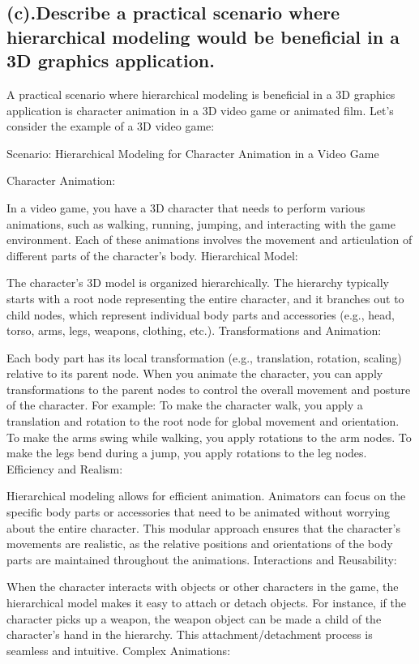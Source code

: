 \documentclass{article}
\begin{document}
\begin{itemize}
\subsection{(c).Describe a practical scenario where hierarchical modeling would be beneficial in a 3D graphics application.}
A practical scenario where hierarchical modeling is beneficial in a 3D graphics application is character animation in a 3D video game or animated film. Let's consider the example of a 3D video game:

Scenario: Hierarchical Modeling for Character Animation in a Video Game

Character Animation:

In a video game, you have a 3D character that needs to perform various animations, such as walking, running, jumping, and interacting with the game environment. Each of these animations involves the movement and articulation of different parts of the character's body.
Hierarchical Model:

The character's 3D model is organized hierarchically. The hierarchy typically starts with a root node representing the entire character, and it branches out to child nodes, which represent individual body parts and accessories (e.g., head, torso, arms, legs, weapons, clothing, etc.).
Transformations and Animation:

Each body part has its local transformation (e.g., translation, rotation, scaling) relative to its parent node. When you animate the character, you can apply transformations to the parent nodes to control the overall movement and posture of the character. For example:
To make the character walk, you apply a translation and rotation to the root node for global movement and orientation.
To make the arms swing while walking, you apply rotations to the arm nodes.
To make the legs bend during a jump, you apply rotations to the leg nodes.
Efficiency and Realism:

Hierarchical modeling allows for efficient animation. Animators can focus on the specific body parts or accessories that need to be animated without worrying about the entire character. This modular approach ensures that the character's movements are realistic, as the relative positions and orientations of the body parts are maintained throughout the animations.
Interactions and Reusability:

When the character interacts with objects or other characters in the game, the hierarchical model makes it easy to attach or detach objects. For instance, if the character picks up a weapon, the weapon object can be made a child of the character's hand in the hierarchy. This attachment/detachment process is seamless and intuitive.
Complex Animations:


\end{itemize}
\end{document}
